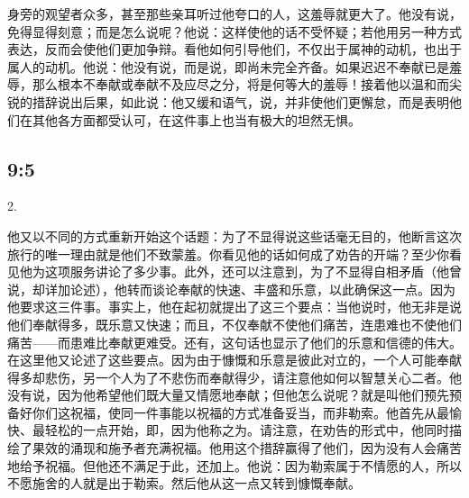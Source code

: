 身旁的观望者众多，甚至那些亲耳听过他夸口的人，这羞辱就更大了。他没有说，免得显得刻意；而是怎么说呢？他说：这样使他的话不受怀疑；若他用另一种方式表达，反而会使他们更加争辩。看他如何引导他们，不仅出于属神的动机，也出于属人的动机。他说：他没有说，而是说，即尚未完全齐备。如果迟迟不奉献已是羞辱，那么根本不奉献或奉献不及应尽之分，将是何等大的羞辱！接着他以温和而尖锐的措辞说出后果，如此说：他又缓和语气，说，并非使他们更懈怠，而是表明他们在其他各方面都受认可，在这件事上也当有极大的坦然无惧。\newline{}\newline{}\newline{}\newline{}\par


\subsection{ 9:5}

2. \par

他又以不同的方式重新开始这个话题：为了不显得说这些话毫无目的，他断言这次旅行的唯一理由就是他们不致蒙羞。你看见他的话如何成了劝告的开端？至少你看见他为这项服务讲论了多少事。此外，还可以注意到，为了不显得自相矛盾（他曾说，却详加论述），他转而谈论奉献的快速、丰盛和乐意，以此确保这一点。因为他要求这三件事。事实上，他在起初就提出了这三个要点：当他说时，他无非是说他们奉献得多，既乐意又快速；而且，不仅奉献不使他们痛苦，连患难也不使他们痛苦——而患难比奉献更难受。还有，这句话也显示了他们的乐意和信德的伟大。在这里他又论述了这些要点。因为由于慷慨和乐意是彼此对立的，一个人可能奉献得多却悲伤，另一个人为了不悲伤而奉献得少，请注意他如何以智慧关心二者。他没有说，因为他希望他们既大量又情愿地奉献；但他怎么说呢？就是叫他们预先预备好你们这祝福，使同一件事能以祝福的方式准备妥当，而非勒索。他首先从最愉快、最轻松的一点开始，即，因为他称之为。请注意，在劝告的形式中，他同时描绘了果效的涌现和施予者充满祝福。他用这个措辞赢得了他们，因为没有人会痛苦地给予祝福。但他还不满足于此，还加上。他说：因为勒索属于不情愿的人，所以不愿施舍的人就是出于勒索。然后他从这一点又转到慷慨奉献。\par

